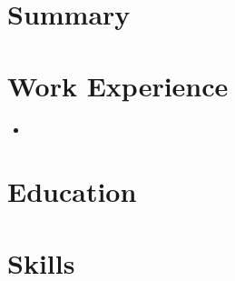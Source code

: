 \documentclass[11pt,a4paper,sans]{moderncv}
\begin{document}
\makecvtitle

            \section{Summary}
        \cvitem{}{  }
                \section{Work Experience}
                    \cventry{  }{  }{  }{  } {}{
            \begin{itemize}
                            \item 
                        \end{itemize}
            }
                        \section{Education}
                    \cventry{  }{  }{  }{}{}{}
                        \section{Skills}
        \cvitem{}{  }
    
\end{document}
